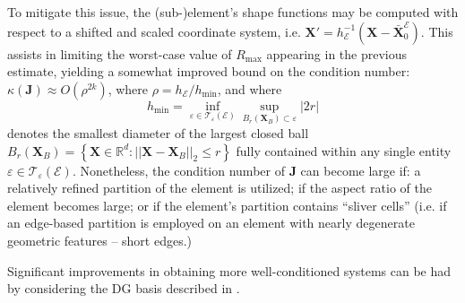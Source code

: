 To mitigate this issue, the (sub-)element's shape functions may be computed with respect to a shifted and scaled coordinate system, i.e. $\mathbf{X}' = h_\mathcal{E}^{-1} (\mathbf{X} - \bar{\mathbf{X}}^{\mathcal{E}}_0)$. This assists in limiting the worst-case value of $R_{\max}$ appearing in the previous estimate, yielding a somewhat improved bound on the condition number: $\kappa (\mathbf{J}) \approx O(\rho^{2k})$, where $\rho = h_{\mathcal{E}} / h_{\min}$, and where
\begin{equation}
	h_{\min} = \inf_{\varepsilon \in \mathcal{T}_\varepsilon (\mathcal{E})} \sup_{B_r (\mathbf{X}_B) \subset \varepsilon} |2r|
\end{equation}
denotes the smallest diameter of the largest closed ball $B_r (\mathbf{X}_B) = \left\{ \mathbf{X} \in \mathbb{R}^d : ||\mathbf{X} - \mathbf{X}_B||_2 \leq r \right\}$ fully contained within any single entity $\varepsilon \in \mathcal{T}_\varepsilon (\mathcal{E})$. Nonetheless, the condition number of $\mathbf{J}$ can become large if: a relatively refined partition of the element is utilized; if the aspect ratio of the element becomes large; or if the element's partition contains ``sliver cells'' (i.e. if an edge-based partition is employed on an element with nearly degenerate geometric features -- short edges.)

Significant improvements in obtaining more well-conditioned systems can be had by considering the DG basis described in \cite{Bassi:12}.

